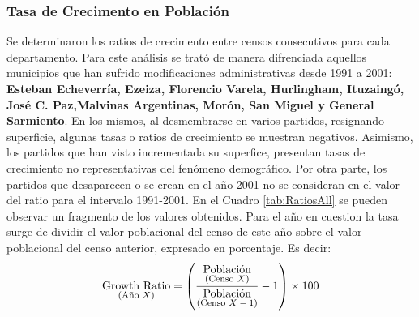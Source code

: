\documentclass{article}
\theoremstyle{mytheoremstyle}
\theoremstyle{mytheoremstyle}
\theoremstyle{myproblemstyle}
\begin{document}
 \subsubsection{Tasa de Crecimento en Población}
  Se determinaron los ratios de crecimento entre censos consecutivos para cada departamento.
  Para este análisis se trató de manera difrenciada aquellos municipios que han sufrido modificaciones administrativas
  desde 1991  a 2001: \textbf{Esteban Echeverría, Ezeiza, Florencio Varela, Hurlingham, Ituzaingó, José C. Paz,Malvinas Argentinas, 
Morón, San Miguel y General Sarmiento}. En los mismos, al desmembrarse en varios partidos, resignando superficie, algunas tasas o ratios de crecimiento 
  se muestran negativos. Asimismo, los partidos que han visto incrementada su superfice, presentan tasas de crecimiento no representativas del 
  fenómeno demográfico.\newline\newline
  Por otra parte, los partidos que desaparecen o se crean en el año 2001 no se consideran en el valor del ratio para el intervalo 1991-2001.\newline\newline
    En el Cuadro \ref{tab:RatiosAll} se pueden observar un fragmento de los valores obtenidos. Para el año en cuestion la tasa surge de dividir el valor poblacional
  del censo de este año sobre el valor poblacional del censo anterior, expresado en porcentaje.\newline\newline
  Es decir: 
  \begin{equation}
    \underset{\text{\footnotesize(Año $X$)}}{\text{Growth Ratio}} = 
    \left( \frac{\underset{\text{\footnotesize(Censo $X$)}}{\text{Población}}}{\underset{\text{\footnotesize(Censo $X-1$)}}{\text{Población}}} - 1 \right) \times 100
  \end{equation}
\end{document}
